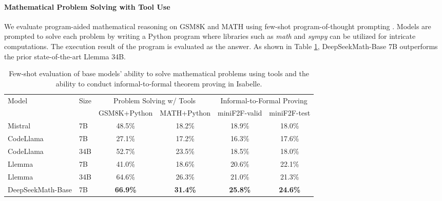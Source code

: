 \documentclass[11pt, a4paper, logo, copyright, nonumbering]{deepseek}
\newcommand{\spmath}{DeepSeekMath}
\begin{document}
\begin{CJK*}{UTF8}{gbsn}
\paragraph{Mathematical Problem Solving with Tool Use}
We evaluate program-aided mathematical reasoning on GSM8K and MATH using few-shot program-of-thought prompting \citep{pot,pal}.
Models are prompted to solve each problem by writing a Python program where libraries such as \textit{math} and \textit{sympy} can be utilized for intricate computations.
The execution result of the program is evaluated as the answer.
As shown in Table \ref{tab:base_math_pot_proof}, \spmath-Base 7B outperforms the prior state-of-the-art Llemma 34B.

\begingroup
\setlength{\tabcolsep}{3pt} 
\renewcommand{\arraystretch}{1} 
\begin{table}[htb]
    \centering
\begin{small}
\begin{tabular}{llcccc} 
\toprule
\multicolumn{1}{l}{\multirow{2}{*}{Model}}  & \multicolumn{1}{l}{\multirow{2}{*}{Size}} &\multicolumn{2}{c}{Problem Solving w/ Tools}                                                             & \multicolumn{2}{c}{Informal-to-Formal Proving}           \\ \cmidrule(lr){3-4}\cmidrule(lr){5-6}
& & GSM8K+Python           & MATH+Python     & miniF2F-valid    & miniF2F-test    \\ 
\midrule
Mistral & 7B                           & 48.5\%          & 18.2\%       &      18.9\%         &  18.0\%          \\ 
\midrule
CodeLlama & 7B    & 27.1\%          & 17.2\%       & 16.3\%        & 17.6\%         \\
CodeLlama& 34B                                 & 52.7\%          & 23.5\%      & 18.5\%        & 18.0\%       \\ 
\midrule
Llemma & 7B  & 41.0\%          & 18.6\%     & 20.6\%        & 22.1\%        \\
Llemma& 34B                                 & 64.6\% & 26.3\%      & 21.0\%        & 21.3\%         \\ 
\midrule
\spmath-Base & 7B                & \textbf{66.9\%}          & \textbf{31.4\%}  & \textbf{25.8\%}        & \textbf{24.6\%}    \\
\bottomrule
\end{tabular}
\end{small}
    \caption{
    Few-shot evaluation of base models' ability to solve mathematical problems using tools and the ability to conduct informal-to-formal theorem proving in Isabelle.
    }
    \label{tab:base_math_pot_proof}
\end{table}
\endgroup


\end{CJK*}
\end{document}
